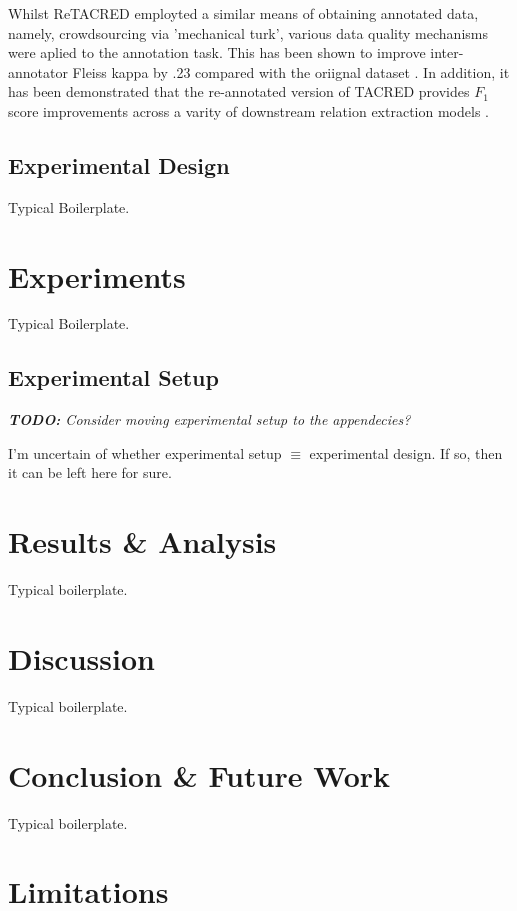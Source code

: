 \documentclass[11pt]{article}
\begin{document}
Whilst ReTACRED employted a similar means of obtaining annotated data, namely, crowdsourcing via 'mechanical turk', various data quality mechanisms were aplied to the annotation task. This has been shown to improve inter-annotator Fleiss kappa by .23 compared with the oriignal dataset \cite{xhang et al 2017}. In addition, it has been demonstrated that the re-annotated version of TACRED provides $F_{1}$ score improvements across a varity of downstream relation extraction models \cite{ref3, ref4, ref5}.


\subsection{Experimental Design}

Typical Boilerplate.

\section{Experiments}

Typical Boilerplate.

\subsection{Experimental Setup}

\emph{\textbf{TODO:} Consider moving experimental setup to the appendecies?}

I'm uncertain of whether experimental setup $\equiv$ experimental design. If so, then it can be left here for sure.

\section{Results \& Analysis}

Typical boilerplate\cite{-casacuberta-2022-shot}.

\section{Discussion}

Typical boilerplate.

\section{Conclusion \& Future Work}

Typical boilerplate.

\section*{Limitations}
\end{document}
